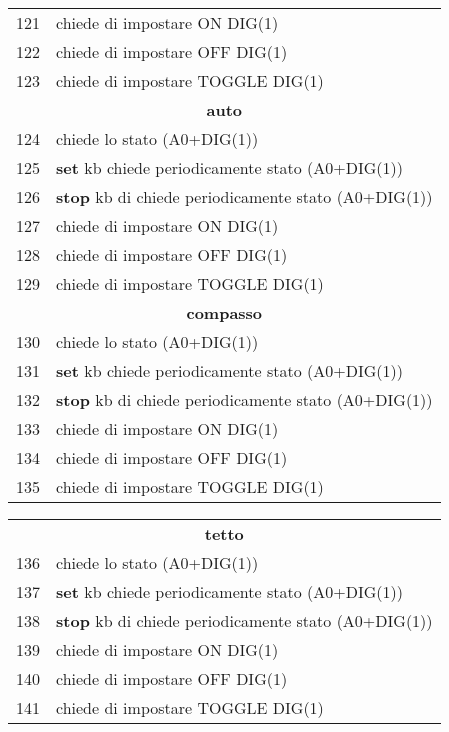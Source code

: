 \documentclass{article}
\begin{document}
\begin{tabular}{ll}
        121 & chiede di impostare ON DIG(1)     \\
        122 & chiede di impostare OFF DIG(1)    \\
        123 & chiede di impostare TOGGLE DIG(1) \\        
        \multicolumn{2}{c}{\textbf{auto}}\\
        124 & chiede lo stato (A0+DIG(1))\\
        125 & \textbf{set} kb chiede periodicamente stato (A0+DIG(1))\\
        126 & \textbf{stop} kb di chiede periodicamente stato (A0+DIG(1))\\
        127 & chiede di impostare ON DIG(1)     \\
        128 & chiede di impostare OFF DIG(1)    \\
        129 & chiede di impostare TOGGLE DIG(1) \\                
        \multicolumn{2}{c}{\textbf{compasso}}\\
        130 & chiede lo stato (A0+DIG(1))\\
        131 & \textbf{set} kb chiede periodicamente stato (A0+DIG(1))\\
        132 & \textbf{stop} kb di chiede periodicamente stato (A0+DIG(1))\\
        133 & chiede di impostare ON DIG(1)     \\
        134 & chiede di impostare OFF DIG(1)    \\
        135 & chiede di impostare TOGGLE DIG(1) \\                        
    \end{tabular}    
    \newpage
    \begin{tabular}{ll}        
        \multicolumn{2}{c}{\textbf{tetto}}\\
        136 & chiede lo stato (A0+DIG(1))\\
        137 & \textbf{set} kb chiede periodicamente stato (A0+DIG(1))\\
        138 & \textbf{stop} kb di chiede periodicamente stato (A0+DIG(1))\\
        139 & chiede di impostare ON DIG(1)     \\
        140 & chiede di impostare OFF DIG(1)    \\
        141 & chiede di impostare TOGGLE DIG(1) \\                                
    \end{tabular}
    
\end{document}
